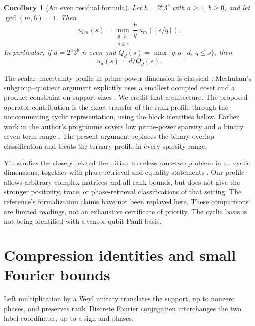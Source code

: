\documentclass[11pt,a4paper]{article}
\newtheorem{corollary}[theorem]{Corollary}
\theoremstyle{remark}\newtheorem{remark}[theorem]{Remark}
\newcommand{\fl}[1]{\left\lfloor #1\right\rfloor}
\begin{document}
\begin{corollary}[An even residual formula]\label{cor:residual}
Let $h=2^a3^b$ with $a\ge1$, $b\ge0$, and let $\gcd(m,6)=1$. Then
\[
 u_{hm}(s)=
 \min_{\substack{q\mid h\\q\le s}} \frac hq\,
                  u_m\!\left(\fl{s/q}\right).
\]
In particular, if $d=2^a3^b$ is even and
$Q_d(s)=\max\{q:q\mid d,\ q\le s\}$, then
\[
                         u_d(s)=d/Q_d(s).
\]
\end{corollary}

The scalar uncertainty profile in prime-power dimension is classical
\cite{dvb}; Meshulam's subgroup--quotient argument explicitly uses a
smallest occupied coset and a product constraint on support sizes
\cite[Proposition 1.3 and Section 2]{meshulam}. We credit that architecture.
The proposed operator contribution is the exact transfer of the rank
profile through the noncommuting cyclic representation, using the block
identities below. Earlier work in the author's programme covers low
prime-power sparsity and a binary seven-term range \cite{prior,seven}.
The present argument replaces the binary overlap classification and
treats the ternary profile in every sparsity range.

Yin studies the closely related Hermitian traceless rank-two problem in
all cyclic dimensions, together with phase-retrieval and equality
statements \cite{yin}. Our profile allows arbitrary complex matrices and
all rank bounds, but does not give the stronger positivity, trace, or
phase-retrieval classifications of that setting. The reference's
formalization claims have not been replayed here. These comparisons are
limited readings, not an exhaustive certificate of priority.
The cyclic basis is not being identified with a tensor-qubit Pauli basis.

\section{Compression identities and small Fourier bounds}
Left multiplication by a Weyl unitary translates the support, up to
nonzero phases, and preserves rank. Discrete Fourier conjugation
interchanges the two label coordinates, up to a sign and phases.
\end{document}
